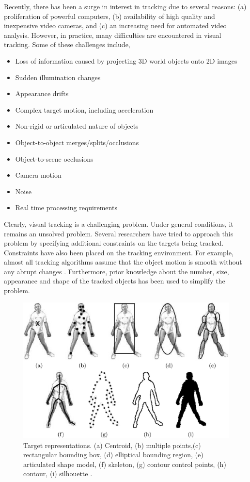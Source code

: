 Recently, there has been a surge in interest in tracking due to several reasons: (a) proliferation of powerful computers, (b) availability of high quality and inexpensive video cameras, and (c) an increasing need for automated video analysis.  However, in practice, many difficulties are encountered in visual tracking.  Some of these challenges include, 

\begin{itemize}
\item Loss of information caused by projecting 3D world objects onto 2D images
\item Sudden illumination changes
\item Appearance drifts
\item Complex target motion, including acceleration
\item Non-rigid or articulated nature of objects
\item Object-to-object merges/splits/occlusions
\item Object-to-scene occlusions
\item Camera motion
\item Noise
\item Real time processing requirements
\end{itemize} 

Clearly, visual tracking is a challenging problem.  Under general conditions, it remains an unsolved problem.  Several researchers have tried to approach this problem by specifying additional constraints on the targets being tracked.  Constraints have also been placed on the tracking environment.  For example, almost all tracking algorithms assume that the object motion is smooth without any abrupt changes \cite{2006_JNL_SURVEYtrk_Yilmaz}.  Furthermore, prior knowledge about the number, size, appearance and shape of the tracked objects has been used to simplify the problem.  

\begin{figure}[t]
	\center
	\includegraphics[width=1.0\textwidth]{thesis/2006_JNL_TRKsurvey_Shah_fig1.png}
	\caption{Target representations.  (a) Centroid, (b) multiple points,(c) rectangular bounding box, (d) elliptical bounding region, (e) articulated shape model, (f) skeleton, (g) contour control points, (h) contour, (i) silhouette \cite{2006_JNL_SURVEYtrk_Yilmaz}.}
	\label{fig:TRK_objectRepresentations}
\end{figure}

